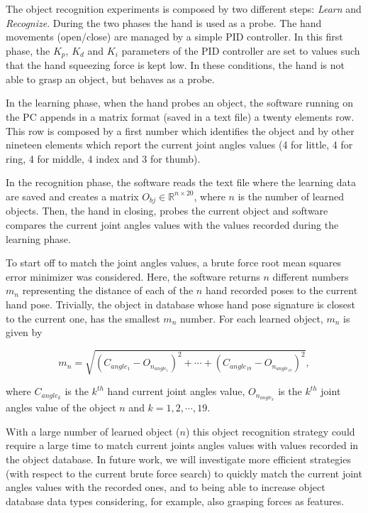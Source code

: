 The object recognition experiments is composed by two different steps: \textit{Learn} and \textit{Recognize}. During the two phases the hand is used as a probe.
The hand movements (open/close) are managed by a simple PID controller. In this first phase, the $K_p$, $K_d$ and $K_i$ parameters of the PID controller are set to values such that the hand squeezing force is kept low. In these conditions, the hand is not able to grasp an object, but behaves as a probe.

In the learning phase, when the hand probes an object, the software running on the PC appends in a matrix format  (saved in a text file) a twenty elements row. This row is composed by a first number which identifies the object and by other nineteen elements which report the current joint angles values (4 for little, 4 for ring, 4 for middle, 4 index and 3 for thumb).

In the recognition phase, the software reads the text file where the learning data are saved and creates a matrix $O_{bj} \in \mathbb{R}^{n \times 20}$, where $n$ is the number of learned objects.
Then, the hand in closing, probes the current object and software compares the current joint angles values with the values recorded during the learning phase.

To start off to match the joint angles values, a brute force root mean squares error minimizer was considered. Here, the software returns $n$ different numbers $m_n$ representing the distance of each of the $n$ hand recorded poses to the current hand pose. Trivially, the object in database whose hand pose signature is  closest to the current one, has the smallest $m_n$ number.
For each learned object, $m_n$ is given by

\begin{equation}
m_n = \sqrt{(C_{angle_{1}} - O_{n_{angle_{1}}})^2 + \cdots + (C_{angle_{19}} - O_{n_{angle_{19}}})^2 },
\end{equation}

\noindent where $C_{angle_{k}}$ is the $k^{th}$ hand current joint angles value, $O_{n_{angle_{k}}}$ is the $k^{th}$ joint angles value of the object $n$ and $k=1, 2 , \cdots , 19$.

With a large number of learned object ($n$) this object recognition strategy could require a large time to match current joints angles values with values recorded in the object database. In future work, we will investigate more efficient strategies (with respect to the current brute force search) to quickly match the current joint angles values with the recorded ones, and to being able to increase object database data types considering, for example, also grasping forces as features.

